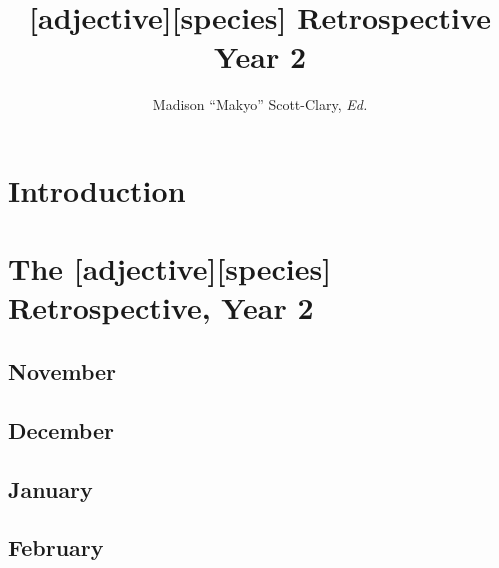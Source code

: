 \documentclass[12pt,letterpaper,oneside]{memoir}
\begin{document}
  \title{[adjective][species] Retrospective Year 2}
  \author{Madison ``Makyo'' Scott-Clary, \textit{Ed.}}
  \maketitle
  \newpage

  \tableofcontents

  \part{Introduction}
  

  \part{The [adjective][species] Retrospective, Year 2}
  \chapter{November}
  
  
  
  
  

  \chapter{December}
  
  
  
  
  
  
  

  \chapter{January}
  
  
  
  
  
  
  

  \chapter{February}
\end{document}
